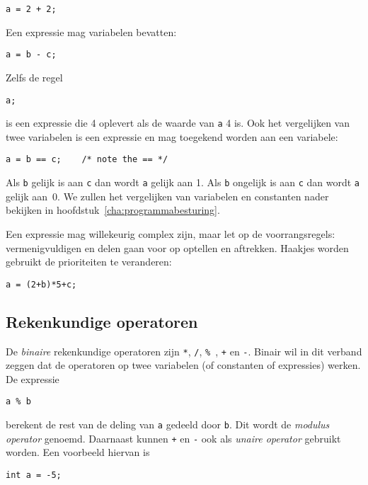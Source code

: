 \hspace*{1em}\texttt{a = 2 + 2;}

Een expressie mag variabelen bevatten:

\hspace*{1em}\texttt{a = b - c;}

Zelfs de regel

\hspace*{1em}\texttt{a;}

is een expressie die 4 oplevert als de waarde van \texttt{a} 4 is. Ook het vergelijken van twee variabelen is een expressie en mag toegekend worden aan een variabele:

\hspace*{1em}\texttt{a = b == c; \ \ \  /* note the == */}

Als \texttt{b} gelijk is aan \texttt{c} dan wordt \texttt{a} gelijk aan 1. Als \texttt{b} ongelijk is aan \texttt{c} dan wordt \texttt{a} gelijk aan~0. We zullen het vergelijken van variabelen en constanten nader bekijken in hoofdstuk~\ref{cha:programmabesturing}.

Een expressie mag willekeurig complex zijn, maar let op de voorrangsregels: vermenigvuldigen en delen gaan voor op optellen en aftrekken. Haakjes worden gebruikt de prioriteiten te veranderen:

\hspace*{1em}\texttt{a = (2+b)*5+c;}

\subsection{Rekenkundige operatoren}
De \textsl{binaire} rekenkundige operatoren zijn \texttt{*}, \texttt{/}, \texttt{\% }, \texttt{+} en \texttt{-}. Binair wil in dit verband zeggen dat de operatoren op twee variabelen (of constanten of expressies) werken. De expressie

\hspace*{1em}\texttt{a \% b}

berekent de rest van de deling van \texttt{a} gedeeld door \texttt{b}. Dit wordt de \textsl{modulus operator} genoemd. Daarnaast kunnen \texttt{+} en \texttt{-} ook als \textsl{unaire operator} gebruikt worden. Een voorbeeld hiervan is

\hspace*{1em}\texttt{int a = -5;}


